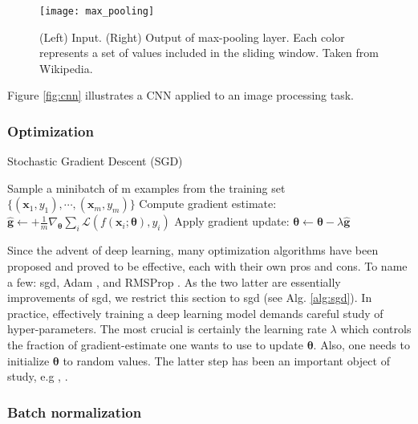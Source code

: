 \begin{figure}[!htpb]
  \centering
  \texttt{[image: max\_pooling]}
  \caption{(Left) Input. (Right) Output of max-pooling layer. Each color represents a set of values included in the sliding window. Taken from Wikipedia.}
  \label{fig:max_pool}
\end{figure}
Figure \ref{fig:cnn} illustrates a CNN applied to an image processing task.

\subsubsection{Optimization}

\begin{algorithm}
 \caption{Stochastic Gradient Descent (SGD)}
 \label{alg:sgd}

 \begin{algorithmic}[1]
  \Repeat
    \State Sample a minibatch of m examples from the training set $\{(\bm{x}_{1},y_{1}), \cdots, (\bm{x}_{m},y_{m})\}$
    \State Compute gradient estimate: $\hat{\bm{g}} \leftarrow + \frac{1}{m} \nabla_{\bm{\theta}}\sum_{i}\mathcal{L}(f(\bm{x}_{i}; \bm{\theta}), y_{i})$
    \State Apply gradient update: $\bm{\theta} \leftarrow \bm{\theta} - \lambda \hat{\bm{g}}$
  \end{algorithmic}
\end{algorithm}

Since the advent of deep learning, many optimization algorithms have been proposed and proved to be effective, each with their own pros and cons.
To name a few: \gls{sgd}, Adam \cite{kingma14}, and RMSProp \cite{tieleman12}.
As the two latter are essentially improvements of \gls{sgd}, we restrict this section to \gls{sgd} (see Alg. \ref{alg:sgd}).
In practice, effectively training a deep learning model demands careful study of hyper-parameters.
The most crucial is certainly the learning rate $\lambda$ which controls the fraction of gradient-estimate one wants to use to update $\bm{\theta}$.
Also, one needs to initialize $\bm{\theta}$ to random values.
The latter step has been an important object of study, e.g \cite{he15}, \cite{glorot10}.



\subsubsection{Batch normalization}

